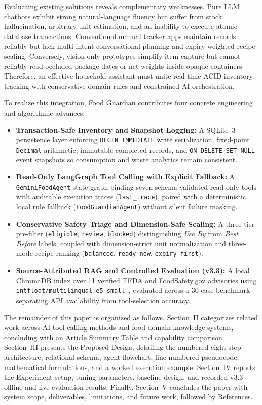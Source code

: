 \documentclass[conference]{IEEEtran}
\begin{document}
Evaluating existing solutions reveals complementary weaknesses. Pure LLM chatbots exhibit strong natural-language fluency but suffer from stock hallucination, arbitrary unit estimation, and an inability to execute atomic database transactions. Conventional manual tracker apps maintain records reliably but lack multi-intent conversational planning and expiry-weighted recipe scaling. Conversely, vision-only prototypes simplify item capture but cannot reliably read occluded package dates or net weights inside opaque containers. Therefore, an effective household assistant must unite real-time ACID inventory tracking with conservative domain rules and constrained AI orchestration.

To realize this integration, Food Guardian contributes four concrete engineering and algorithmic advances:
\begin{itemize}
    \item \textbf{Transaction-Safe Inventory and Snapshot Logging:} A SQLite~3 persistence layer enforcing \texttt{BEGIN IMMEDIATE} write serialization, fixed-point \texttt{Decimal} arithmetic, immutable completed records, and \texttt{ON DELETE SET NULL} event snapshots so consumption and waste analytics remain consistent.
    \item \textbf{Read-Only LangGraph Tool Calling with Explicit Fallback:} A \texttt{GeminiFoodAgent} state graph binding seven schema-validated read-only tools with auditable execution traces (\texttt{last\_trace}), paired with a deterministic local rule fallback (\texttt{FoodGuardianAgent}) without silent failure masking.
    \item \textbf{Conservative Safety Triage and Dimension-Safe Scaling:} A three-tier pre-filter (\texttt{eligible}, \texttt{review}, \texttt{blocked}) distinguishing \emph{Use By} from \emph{Best Before} labels, coupled with dimension-strict unit normalization and three-mode recipe ranking (\texttt{balanced}, \texttt{ready\_now}, \texttt{expiry\_first}).
    \item \textbf{Source-Attributed RAG and Controlled Evaluation (v3.3):} A local ChromaDB index over 11 verified TFDA and FoodSafety.gov advisories using \texttt{intfloat/multilingual-e5-small}~\cite{wang2024e5}, evaluated across a 30-case benchmark separating API availability from tool-selection accuracy.
\end{itemize}

The remainder of this paper is organized as follows. Section~II categorizes related work across AI tool-calling methods and food-domain knowledge systems, concluding with an Article Summary Table and capability comparison. Section~III presents the Proposed Design, detailing the numbered eight-step architecture, relational schema, agent flowchart, line-numbered pseudocode, mathematical formulations, and a worked execution example. Section~IV reports the Experiment setup, tuning parameters, baseline design, and recorded v3.3 offline and live evaluation results. Finally, Section~V concludes the paper with system scope, deliverables, limitations, and future work, followed by References.
\end{document}
